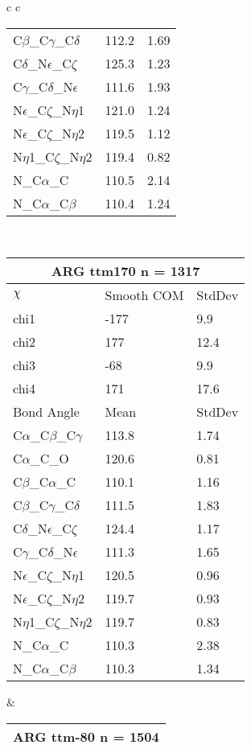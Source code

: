 \begin{longtable}{ c c }
\begin{tabular}{ l l l }
  C$\beta$\_C$\gamma$\_C$\delta$ & 112.2 & 1.69\\
  C$\delta$\_N$\epsilon$\_C$\zeta$ & 125.3 & 1.23\\
  C$\gamma$\_C$\delta$\_N$\epsilon$ & 111.6 & 1.93\\
  N$\epsilon$\_C$\zeta$\_N$\eta$1 & 121.0 & 1.24\\
  N$\epsilon$\_C$\zeta$\_N$\eta$2 & 119.5 & 1.12\\
  N$\eta$1\_C$\zeta$\_N$\eta$2 & 119.4 & 0.82\\
  N\_C$\alpha$\_C & 110.5 & 2.14\\
  N\_C$\alpha$\_C$\beta$ & 110.4 & 1.24\\
  \bottomrule
  \end{tabular}
  \\
  \begin{tabular}{ l l l }
  \toprule
  \multicolumn{3}{c}{ARG \textbf{ttm170} n = 1317} \\ \toprule
  $\chi$       & Smooth COM & StdDev \\ \midrule
  chi1 & -177 & 9.9 \\ 
  chi2 & 177 & 12.4 \\ 
  chi3 & -68 & 9.9 \\ 
  chi4 & 171 & 17.6 \\ \midrule
  Bond Angle   & Mean     & StdDev \\ \midrule
  C$\alpha$\_C$\beta$\_C$\gamma$ & 113.8 & 1.74\\
  C$\alpha$\_C\_O & 120.6 & 0.81\\
  C$\beta$\_C$\alpha$\_C & 110.1 & 1.16\\
  C$\beta$\_C$\gamma$\_C$\delta$ & 111.5 & 1.83\\
  C$\delta$\_N$\epsilon$\_C$\zeta$ & 124.4 & 1.17\\
  C$\gamma$\_C$\delta$\_N$\epsilon$ & 111.3 & 1.65\\
  N$\epsilon$\_C$\zeta$\_N$\eta$1 & 120.5 & 0.96\\
  N$\epsilon$\_C$\zeta$\_N$\eta$2 & 119.7 & 0.93\\
  N$\eta$1\_C$\zeta$\_N$\eta$2 & 119.7 & 0.83\\
  N\_C$\alpha$\_C & 110.3 & 2.38\\
  N\_C$\alpha$\_C$\beta$ & 110.3 & 1.34\\
  \bottomrule
  \end{tabular}
  &
  \begin{tabular}{ l l l }
  \toprule
  \multicolumn{3}{c}{ARG \textbf{ttm-80} n = 1504} \\ \toprule

\end{tabular}
\end{longtable}
